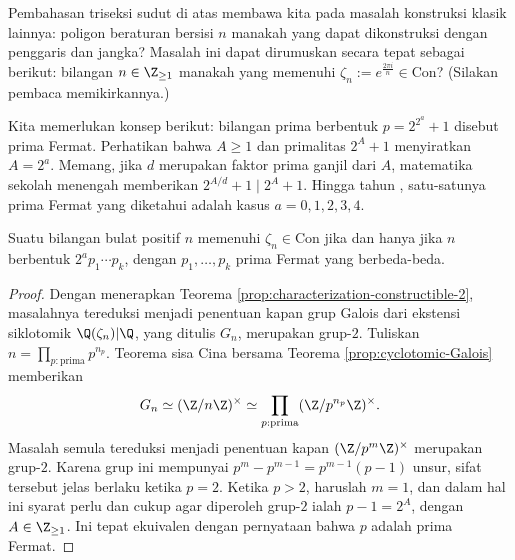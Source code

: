 Pembahasan triseksi sudut di atas membawa kita pada masalah konstruksi klasik lainnya: poligon beraturan bersisi $n$ manakah yang dapat dikonstruksi dengan penggaris dan jangka? Masalah ini dapat dirumuskan secara tepat sebagai berikut: bilangan $n \in \Z_{\geq 1}$ manakah yang memenuhi $\zeta_n := e^{\frac{2\pi i}{n}} \in \text{Con}$? (Silakan pembaca memikirkannya.)

Kita memerlukan konsep berikut: bilangan prima berbentuk $p = 2^{2^a} + 1$ disebut prima Fermat. Perhatikan bahwa $A \geq 1$ dan primalitas $2^A + 1$ menyiratkan $A = 2^a$. Memang, jika $d$ merupakan faktor prima ganjil dari $A$, matematika sekolah menengah memberikan $2^{A/d} + 1 \mid 2^A + 1$. Hingga tahun \the\year, satu-satunya prima Fermat yang diketahui adalah kasus $a=0,1,2,3,4$.

\begin{theorem}
	Suatu bilangan bulat positif $n$ memenuhi $\zeta_n \in \mathrm{Con}$ jika dan hanya jika $n$ berbentuk $2^a p_1 \cdots p_k$, dengan $p_1, \ldots, p_k$ prima Fermat yang berbeda-beda.
\end{theorem}
\begin{proof}
	Dengan menerapkan Teorema \ref{prop:characterization-constructible-2}, masalahnya tereduksi menjadi penentuan kapan grup Galois dari ekstensi siklotomik $\Q(\zeta_n)|\Q$, yang ditulis $G_n$, merupakan grup-$2$. Tuliskan $n = \prod_{p: \text{prima}} p^{n_p}$. Teorema sisa Cina bersama Teorema \ref{prop:cyclotomic-Galois} memberikan
	\[ G_n \simeq (\Z/n\Z)^\times \simeq \prod_{p: \text{prima}} (\Z/p^{n_p}\Z)^\times. \]
	Masalah semula tereduksi menjadi penentuan kapan $(\Z/p^m \Z)^\times$ merupakan grup-$2$. Karena grup ini mempunyai $p^m - p^{m-1} = p^{m-1}(p-1)$ unsur, sifat tersebut jelas berlaku ketika $p=2$. Ketika $p>2$, haruslah $m = 1$, dan dalam hal ini syarat perlu dan cukup agar diperoleh grup-$2$ ialah $p-1 = 2^A$, dengan $A \in \Z_{\geq 1}$. Ini tepat ekuivalen dengan pernyataan bahwa $p$ adalah prima Fermat.
\end{proof}

